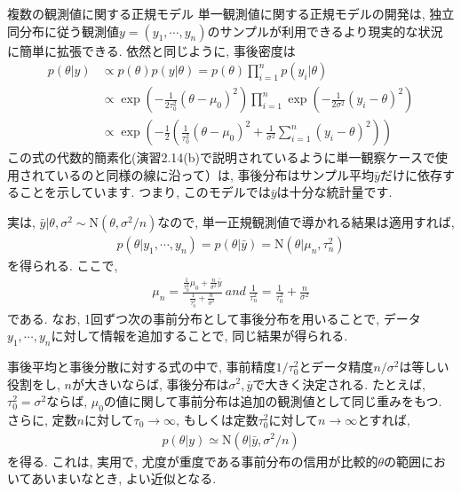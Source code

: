 \documentclass[10pt,dvipdfmx,a4]{beamer}
\newcommand{\eq}[1]{\begin{align}#1\end{align}}
\newcommand{\eqn}[1]{\begin{align*}#1\end{align*}}
\begin{document}
\begin{frame}{複数の観測値に関する正規モデル}
単一観測値に関する正規モデルの開発は, 独立同分布に従う観測値$y=(y_1,\cdots,y_n)$のサンプルが利用できるより現実的な状況に簡単に拡張できる.
依然と同じように, 事後密度は
\eqn{p(\theta|y)&\propto p(\theta)p(y|\theta)=p(\theta)\prod_{i=1}^n p(y_i|\theta)\\
&\propto \exp\left(-\frac{1}{2\tau_0^2}(\theta-\mu_0)^2\right) \prod_{i=1}^n \exp\left(-\frac{1}{2\sigma^2}(y_i-\theta)^2\right)\\
&\propto \exp\left(-\frac{1}{2}  \left( \frac{1}{\tau_0^2}(\theta-\mu_0)^2+\frac{1}{\sigma^2}\sum_{i=1}^n (y_i-\theta)^2\right)\right)}
この式の代数的簡素化(演習2.14(b)で説明されているように単一観察ケースで使用されているのと同様の線に沿って）は, 事後分布はサンプル平均$\bar{y}$だけに依存することを示しています.
つまり, このモデルでは$\bar{y}$は十分な統計量です.
\end{frame}


\begin{frame}
実は, $\bar{y}|\theta, \sigma^2 \sim \text{N}(\theta,\sigma^2/n)$なので, 単一正規観測値で導かれる結果は適用すれば, 
\eq{p(\theta|y_1,\cdots,y_n)=p(\theta|\bar{y})=\text{N}(\theta|\mu_n,\tau_n^2)}
を得られる.
ここで,
\eq{\mu_n=\frac{\tfrac{1}{\tau_0^2}\mu_0+\frac{n}{\sigma^2}\bar{y}}{\frac{1}{\tau_0^2}+\frac{n}{\sigma^2}}\ and\ \frac{1}{\tau_n^2}=\frac{1}{\tau_0^2}+\frac{n}{\sigma^2}}
である.
なお, 1回ずつ次の事前分布として事後分布を用いることで, データ$y_1,\cdots,y_n$に対して情報を追加することで, 同じ結果が得られる.

事後平均と事後分散に対する式の中で, 事前精度$1/\tau_0^2$とデータ精度$n/\sigma^2$は等しい役割をし, $n$が大きいならば, 事後分布は$\sigma^2, \bar{y}$で大きく決定される.
たとえば, $\tau_0^2=\sigma^2$ならば, $\mu_0$の値に関して事前分布は追加の観測値として同じ重みをもつ.
さらに, 定数$n$に対して$\tau_0\rightarrow \infty$, もしくは定数$\tau_0^2$に対して$n\rightarrow \infty$とすれば,
\eq{p(\theta|y)\simeq \text{N}(\theta|\bar{y},\sigma^2/n)}
を得る.
これは, 実用で, 尤度が重度である事前分布の信用が比較的$\theta$の範囲においてあいまいなとき, よい近似となる.
\end{frame}

\end{document}
